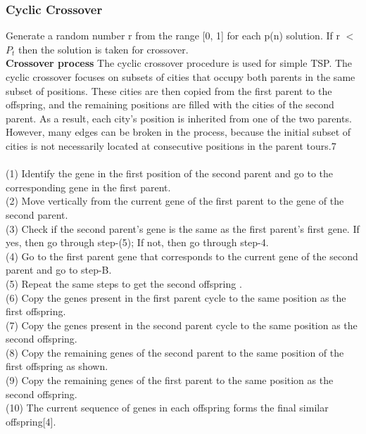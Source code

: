 \documentclass{article}
\begin{document}
\subsubsection{Cyclic Crossover}
Generate a random number r from the range [0, 1] for each p(n) solution. If r $<$ $P_t$ then the solution is
taken for crossover.
\\
  \vspace{0cm}\textbf{Crossover process   }
The cyclic crossover procedure is used for simple TSP. The cyclic crossover focuses on subsets of cities that occupy
both parents in the same subset of positions. These cities are then copied from the first parent to the offspring, and
the remaining positions are filled with the cities of the second parent. As a result, each city's position is inherited
from one of the two parents. However, many edges can be broken in the process, because the initial subset of cities
is not necessarily located at consecutive positions in the parent tours.7\\
\\(1) Identify the gene in the first position of the second parent and go to the corresponding gene in the first parent.\\ (2)
Move vertically from the current gene of the first parent to the gene of the second parent.\\ (3) Check if the second
parent's gene is the same as the first parent's first gene. If yes, then go through step-(5); If not, then go through
step-4.\\ (4) Go to the first parent gene that corresponds to the current gene of the second parent and go to step-B.\\ (5)
Repeat the same steps to get the second offspring .\\ (6) Copy the genes present in the first parent cycle to the same
position as the first offspring. \\ (7) Copy the genes present in the second parent cycle to the same position as the
second offspring.\\(8) Copy the remaining genes of the second parent to the same position of the first offspring as
shown. \\(9) Copy the remaining genes of the first parent to the same position as the second offspring.\\ (10) The
current sequence of genes in each offspring forms the final similar offspring[4].
\end{document}
